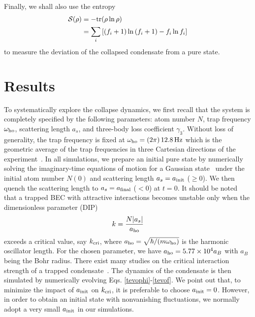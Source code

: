 \documentclass[pra,twocolumn,preprintnumbers,superscriptaddress,longbibliography,showkeys]{revtex4-1}
\begin{document}
Finally, we shall also use the entropy
\begin{align}
\mathcal{S}(\rho) &= -{\rm tr} (\rho \ln\rho)\nonumber\\
&= \sum_{i} \left[ (f_{i} + 1) \ln{(f_{i} + 1)} - f_{i} \ln f_{i} \right]
\end{align}
to measure the deviation of the collapsed condensate from a pure state.

\section{R\lowercase{esults}}\label{secresu}
To systematically explore the collapse dynamics, we first recall that the system is completely specified by the following parameters: atom number $N$, trap frequency $\omega_{\rm ho}$, scattering length $a_s$, and three-body loss coefficient $\gamma_3$. Without loss of generality, the trap frequency is fixed at $\omega_{\rm ho}=(2\pi)\,12.8\,{\rm Hz}$ which is the geometric average of the trap frequencies in three Cartesian directions of the experiment~\cite{CllRb2}. In all simulations, we prepare an initial pure state by numerically solving the imaginary-time equations of motion for a Gaussian state~\cite{Shi2019,Wang2020,Pan2021} under the initial atom number $N(0)$ and scattering length $a_s=a_{\rm init}$ ($\geq0$). We then quench the scattering length to $a_s=a_{\rm final}$ ($<0$) at $t=0$. It should be noted that a trapped BEC with attractive interactions becomes unstable only when the dimensionless parameter (DIP)
\begin{align}
k = \frac{N \vert a_{s} \vert}{a_{\rm ho}}
\end{align}
exceeds a critical value, say $k_{\rm cri}$, where $a_{\rm ho}=\sqrt{\hbar/(m\omega_{\rm ho})}$ is the harmonic oscillator length. For the chosen parameter, we have $a_{\rm ho}=5.77\times 10^4a_B$ with $a_B$ being the Bohr radius. There exist many studies on the critical interaction strength of a trapped condensate~\cite{attractiveNLSE, stableLi,Tunneling1, Tunneling2,NcUeda,collapsingDynamic}. The dynamics of the condensate is then simulated by numerically evolving Eqs. \eqref{tevophi}-\eqref{tevof}. We point out that, to minimize the impact of $a_{\rm init}$ on $k_{\rm cri}$, it is preferable to choose $a_{\rm init}=0$. However, in order to obtain an initial state with nonvanishing fluctuations, we normally adopt a very small $a_{\rm init}$ in our simulations.
\end{document}
